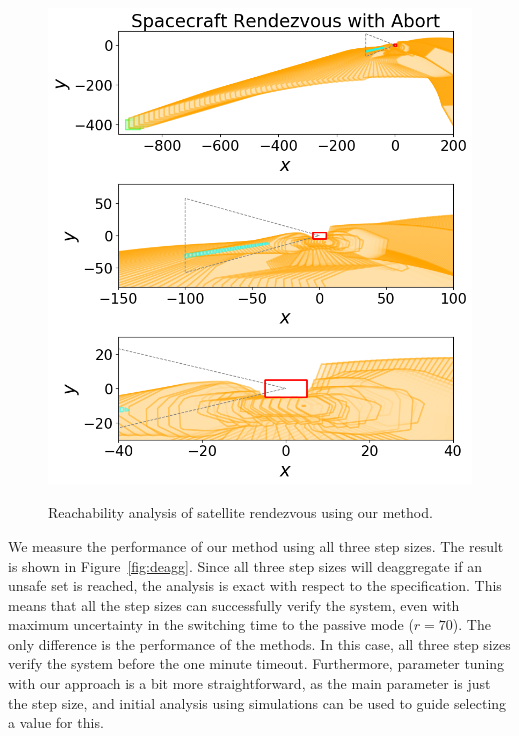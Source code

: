 \begin{figure}
\begin{minipage}{0.48\textwidth}
\begin{minipage}[b]{\linewidth}
\label{fig:deagg}
\end{minipage}
\\
\vspace{0.5em}
\begin{minipage}[b]{\linewidth}
\centerline{\includegraphics[width=\columnwidth]{images/rendezvous.png}}
\label{fig:rendezvous}
\end{minipage}
\caption{Reachability analysis of satellite rendezvous using our method.}
\end{minipage}
\end{figure}


We measure the performance of our method using all three step sizes.
%
The result is shown in Figure~\ref{fig:deagg}.
%
Since all three step sizes will deaggregate if an unsafe set is reached, the analysis is exact with respect to the specification.
%
This means that all the step sizes can successfully verify the system, even with maximum uncertainty in the switching time to the passive mode ($r = 70$).
%
The only difference is the performance of the methods.
%
In this case, all three step sizes verify the system before the one minute timeout.
%
Furthermore, parameter tuning with our approach is a bit more straightforward, as the main parameter is just the step size, and initial
analysis using simulations can be used to guide selecting a value for this.


